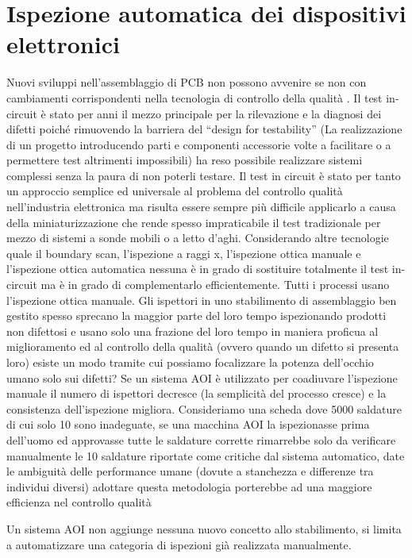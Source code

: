 \chapter{Ispezione automatica dei dispositivi elettronici}
Nuovi sviluppi nell'assemblaggio di PCB non possono avvenire se non con cambiamenti corrispondenti
nella tecnologia di controllo della qualità \cite{4459975}.
Il test in-circuit è stato per anni il mezzo principale per la rilevazione e la diagnosi dei difetti poiché
rimuovendo la barriera del “design for testability” (La realizzazione di un progetto introducendo parti e
componenti accessorie volte a facilitare o a permettere test altrimenti impossibili) ha reso possibile
realizzare sistemi complessi senza la paura di non poterli testare. Il test in circuit è stato per tanto un
approccio semplice ed universale al problema del controllo qualità nell'industria elettronica ma risulta
essere sempre più difficile applicarlo a causa della miniaturizzazione che rende spesso impraticabile il test
tradizionale per mezzo di sistemi a sonde mobili o a letto d’aghi.
Considerando altre tecnologie quale il boundary scan, l'ispezione a raggi x, l'ispezione ottica manuale e
l'ispezione ottica automatica nessuna è in grado di sostituire totalmente il test in-circuit ma è in grado di
complementarlo efficientemente.
Tutti i processi usano l'ispezione ottica manuale. Gli ispettori in uno stabilimento di assemblaggio ben
gestito spesso sprecano la maggior parte del loro tempo ispezionando prodotti non difettosi e usano solo
una frazione del loro tempo in maniera proficua al miglioramento ed al controllo della qualità (ovvero
quando un difetto si presenta loro) esiste un modo tramite cui possiamo focalizzare la potenza dell'occhio
umano solo sui difetti?
Se un sistema AOI è utilizzato per coadiuvare l'ispezione manuale il numero di ispettori decresce (la
semplicità del processo cresce) e la consistenza dell'ispezione migliora. Consideriamo una scheda dove
5000 saldature di cui solo 10 sono inadeguate, se una macchina AOI la ispezionasse prima dell'uomo ed
approvasse tutte le saldature corrette rimarrebbe solo da verificare manualmente le 10 saldature riportate
come critiche dal sistema automatico, date le ambiguità delle performance umane (dovute a stanchezza e
differenze tra individui diversi) adottare questa metodologia porterebbe ad una maggiore efficienza nel controllo qualità

Un sistema AOI non aggiunge nessuna nuovo concetto allo stabilimento, si limita a automatizzare una
categoria di ispezioni già realizzata manualmente.

